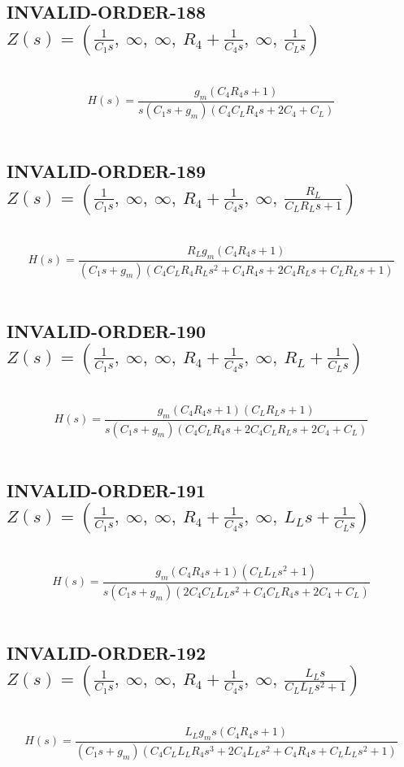 \documentclass{article}
\begin{document}
\subsection{INVALID-ORDER-188 $Z(s) = \left( \frac{1}{C_{1} s}, \  \infty, \  \infty, \  R_{4} + \frac{1}{C_{4} s}, \  \infty, \  \frac{1}{C_{L} s}\right)$ } \ 
\textbf{\[H(s) = \frac{g_{m} \left(C_{4} R_{4} s + 1\right)}{s \left(C_{1} s + g_{m}\right) \left(C_{4} C_{L} R_{4} s + 2 C_{4} + C_{L}\right)}\] } \ 
\subsection{INVALID-ORDER-189 $Z(s) = \left( \frac{1}{C_{1} s}, \  \infty, \  \infty, \  R_{4} + \frac{1}{C_{4} s}, \  \infty, \  \frac{R_{L}}{C_{L} R_{L} s + 1}\right)$ } \ 
\textbf{\[H(s) = \frac{R_{L} g_{m} \left(C_{4} R_{4} s + 1\right)}{\left(C_{1} s + g_{m}\right) \left(C_{4} C_{L} R_{4} R_{L} s^{2} + C_{4} R_{4} s + 2 C_{4} R_{L} s + C_{L} R_{L} s + 1\right)}\] } \ 
\subsection{INVALID-ORDER-190 $Z(s) = \left( \frac{1}{C_{1} s}, \  \infty, \  \infty, \  R_{4} + \frac{1}{C_{4} s}, \  \infty, \  R_{L} + \frac{1}{C_{L} s}\right)$ } \ 
\textbf{\[H(s) = \frac{g_{m} \left(C_{4} R_{4} s + 1\right) \left(C_{L} R_{L} s + 1\right)}{s \left(C_{1} s + g_{m}\right) \left(C_{4} C_{L} R_{4} s + 2 C_{4} C_{L} R_{L} s + 2 C_{4} + C_{L}\right)}\] } \ 
\subsection{INVALID-ORDER-191 $Z(s) = \left( \frac{1}{C_{1} s}, \  \infty, \  \infty, \  R_{4} + \frac{1}{C_{4} s}, \  \infty, \  L_{L} s + \frac{1}{C_{L} s}\right)$ } \ 
\textbf{\[H(s) = \frac{g_{m} \left(C_{4} R_{4} s + 1\right) \left(C_{L} L_{L} s^{2} + 1\right)}{s \left(C_{1} s + g_{m}\right) \left(2 C_{4} C_{L} L_{L} s^{2} + C_{4} C_{L} R_{4} s + 2 C_{4} + C_{L}\right)}\] } \ 
\subsection{INVALID-ORDER-192 $Z(s) = \left( \frac{1}{C_{1} s}, \  \infty, \  \infty, \  R_{4} + \frac{1}{C_{4} s}, \  \infty, \  \frac{L_{L} s}{C_{L} L_{L} s^{2} + 1}\right)$ } \ 
\textbf{\[H(s) = \frac{L_{L} g_{m} s \left(C_{4} R_{4} s + 1\right)}{\left(C_{1} s + g_{m}\right) \left(C_{4} C_{L} L_{L} R_{4} s^{3} + 2 C_{4} L_{L} s^{2} + C_{4} R_{4} s + C_{L} L_{L} s^{2} + 1\right)}\] } \ 
\end{document}

